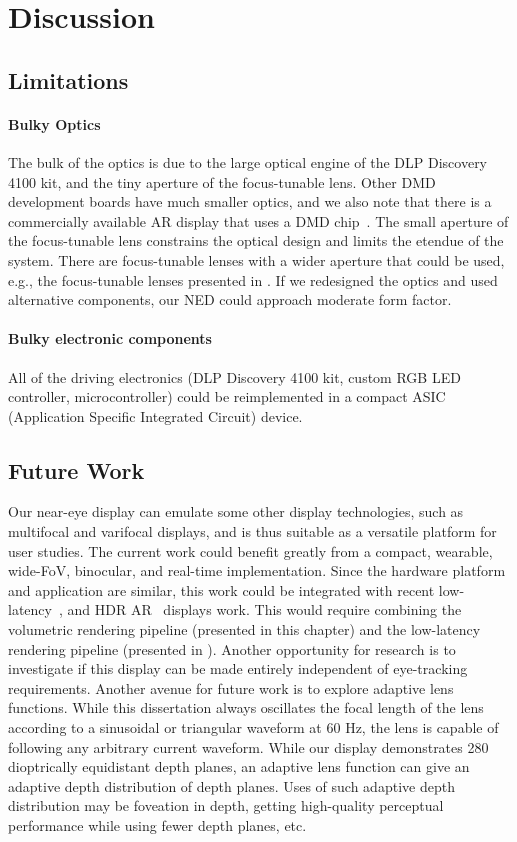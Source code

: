 \section{Discussion}
\label{sec:volumetric:discussion}

\subsection{Limitations}
\paragraph{Bulky Optics}
The bulk of the optics is due to the large optical engine of the DLP Discovery 4100 kit, and the tiny aperture of the focus-tunable lens. Other DMD development boards have much smaller optics, and we also note that there is a commercially available AR display that uses a DMD chip~\cite{Dewald2016Avegant}. The small aperture of the focus-tunable lens constrains the optical design and limits the etendue of the system. There are focus-tunable lenses with a wider aperture that could be used, e.g., the focus-tunable lenses presented in \citet{Dunn2017Wide}. If we redesigned the optics and used alternative components, our NED could approach moderate form factor.

\paragraph{Bulky electronic components}
All of the driving electronics (DLP Discovery 4100 kit, custom RGB LED controller, microcontroller) could be reimplemented in a compact ASIC (Application Specific Integrated Circuit) device. 

\subsection{Future Work}
Our near-eye display can emulate some other display technologies, such as multifocal and varifocal displays, and is thus suitable as a versatile platform for user studies. 
The current work could benefit greatly from a compact, wearable, wide-FoV, binocular, and real-time implementation. 
Since the hardware platform and application are similar, this work could be integrated with recent low-latency~\cite{Lincoln2016motion}, and HDR AR~\cite{Lincoln2017scene} displays work. 
This would require combining the volumetric rendering pipeline (presented in this chapter) and the low-latency rendering pipeline (presented in \citet{Lincoln2016motion,Lincoln2017scene,lincoln2017low}).
Another opportunity for research is to investigate if this display can be made entirely independent of eye-tracking requirements. 
Another avenue for future work is to explore adaptive lens functions. 
While this dissertation always oscillates the focal length of the lens according to a sinusoidal or triangular waveform at 60 Hz, the lens is capable of following any arbitrary current waveform. 
While our display demonstrates 280 dioptrically equidistant depth planes, an adaptive lens function can give an adaptive depth distribution of depth planes. 
Uses of such adaptive depth distribution may be foveation in depth, getting high-quality perceptual performance while using fewer depth planes, etc. 

